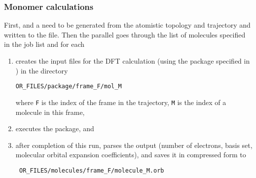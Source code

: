 \subsubsection{Monomer calculations}
First,  and a  need to be generated from the atomistic topology and trajectory and written to the \sqlstate file. Then the parallel  \calculator 
\label{sec:edft}
\vskip 0.1cm
{\small \ctpparallel \opt \xmloptions \sql \sqlstate \exe {} }
\vskip 0.1cm
\noindent goes through the list of molecules specified in the job list and for each 
\begin{enumerate}
 \item creates the input files for the DFT calculation (using the package specified in \xmloptions) in the directory 
\begin{verbatim}
OR_FILES/package/frame_F/mol_M
\end{verbatim}
where {\tt F} is the index of the frame in the trajectory, {\tt M} is the index of a molecule in this frame,
\item executes the package, and
\item after completion of this run, parses the output (number of electrons, basis set, molecular orbital expansion coefficients), and saves it in compressed form to 
\begin{verbatim}
 OR_FILES/molecules/frame_F/molecule_M.orb 
\end{verbatim}
\end{enumerate}


